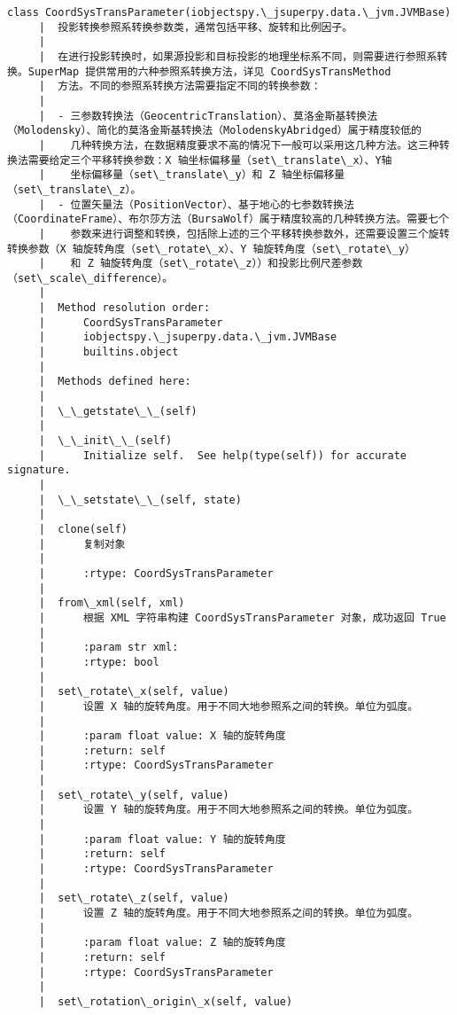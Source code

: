 \documentclass[11pt]{article}
\begin{document}
\begin{Verbatim}[commandchars=\\\{\}]
    class CoordSysTransParameter(iobjectspy.\_jsuperpy.data.\_jvm.JVMBase)
     |  投影转换参照系转换参数类，通常包括平移、旋转和比例因子。
     |  
     |  在进行投影转换时，如果源投影和目标投影的地理坐标系不同，则需要进行参照系转换。SuperMap 提供常用的六种参照系转换方法，详见 CoordSysTransMethod
     |  方法。不同的参照系转换方法需要指定不同的转换参数：
     |  
     |  - 三参数转换法（GeocentricTranslation）、莫洛金斯基转换法（Molodensky）、简化的莫洛金斯基转换法（MolodenskyAbridged）属于精度较低的
     |    几种转换方法，在数据精度要求不高的情况下一般可以采用这几种方法。这三种转换法需要给定三个平移转换参数：X 轴坐标偏移量（set\_translate\_x）、Y轴
     |    坐标偏移量（set\_translate\_y）和 Z 轴坐标偏移量（set\_translate\_z）。
     |  - 位置矢量法（PositionVector）、基于地心的七参数转换法（CoordinateFrame）、布尔莎方法（BursaWolf）属于精度较高的几种转换方法。需要七个
     |    参数来进行调整和转换，包括除上述的三个平移转换参数外，还需要设置三个旋转转换参数（X 轴旋转角度（set\_rotate\_x）、Y 轴旋转角度（set\_rotate\_y）
     |    和 Z 轴旋转角度（set\_rotate\_z））和投影比例尺差参数（set\_scale\_difference）。
     |  
     |  Method resolution order:
     |      CoordSysTransParameter
     |      iobjectspy.\_jsuperpy.data.\_jvm.JVMBase
     |      builtins.object
     |  
     |  Methods defined here:
     |  
     |  \_\_getstate\_\_(self)
     |  
     |  \_\_init\_\_(self)
     |      Initialize self.  See help(type(self)) for accurate signature.
     |  
     |  \_\_setstate\_\_(self, state)
     |  
     |  clone(self)
     |      复制对象
     |      
     |      :rtype: CoordSysTransParameter
     |  
     |  from\_xml(self, xml)
     |      根据 XML 字符串构建 CoordSysTransParameter 对象，成功返回 True
     |      
     |      :param str xml:
     |      :rtype: bool
     |  
     |  set\_rotate\_x(self, value)
     |      设置 X 轴的旋转角度。用于不同大地参照系之间的转换。单位为弧度。
     |      
     |      :param float value: X 轴的旋转角度
     |      :return: self
     |      :rtype: CoordSysTransParameter
     |  
     |  set\_rotate\_y(self, value)
     |      设置 Y 轴的旋转角度。用于不同大地参照系之间的转换。单位为弧度。
     |      
     |      :param float value: Y 轴的旋转角度
     |      :return: self
     |      :rtype: CoordSysTransParameter
     |  
     |  set\_rotate\_z(self, value)
     |      设置 Z 轴的旋转角度。用于不同大地参照系之间的转换。单位为弧度。
     |      
     |      :param float value: Z 轴的旋转角度
     |      :return: self
     |      :rtype: CoordSysTransParameter
     |  
     |  set\_rotation\_origin\_x(self, value)

\end{Verbatim}
\end{document}
